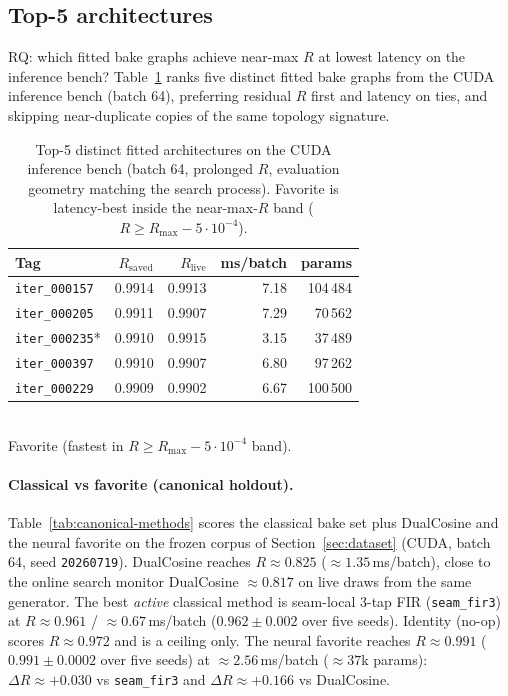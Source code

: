 \subsection{Top-5 architectures}
\label{sec:top5-arch}
RQ: which fitted bake graphs achieve near-max $R$ at lowest latency on the inference bench?
Table~\ref{tab:top5} ranks five distinct fitted bake graphs from the CUDA inference bench
(batch 64), preferring residual $R$ first and latency on ties,
and skipping near-duplicate copies of the same topology signature.

\begin{table}[t]
  \centering
  \caption{Top-5 distinct fitted architectures on the CUDA inference bench (batch 64, prolonged $R$, evaluation geometry matching the search process). Favorite is latency-best inside the near-max-$R$ band ($R\ge R_{\max}-5\cdot10^{-4}$).}
  \label{tab:top5}
  \setlength{\tabcolsep}{3pt}
  \begin{tabular}{@{}lrrrr@{}}
    \toprule
    Tag & $R_{\mathrm{saved}}$ & $R_{\mathrm{live}}$ & ms/batch & params \\
    \midrule
    \texttt{iter\_000157} & 0.9914 & 0.9913 & 7.18 & 104\,484 \\
    \texttt{iter\_000205} & 0.9911 & 0.9907 & 7.29 & 70\,562 \\
    \texttt{iter\_000235}* & 0.9910 & 0.9915 & 3.15 & 37\,489 \\
    \texttt{iter\_000397} & 0.9910 & 0.9907 & 6.80 & 97\,262 \\
    \texttt{iter\_000229} & 0.9909 & 0.9902 & 6.67 & 100\,500 \\
    \bottomrule
  \end{tabular}\\[0.4em]
  {\footnotesize *Favorite (fastest in $R\ge R_{\max}-5\cdot10^{-4}$ band).}
\end{table}

\paragraph{Classical vs favorite (canonical holdout).}
Table~\ref{tab:canonical-methods} scores the classical bake set plus DualCosine and the neural favorite on the frozen corpus of Section~\ref{sec:dataset} (CUDA, batch 64, seed \texttt{20260719}).
DualCosine reaches $R\approx 0.825$ ($\approx 1.35$\,ms/batch), close to the online search monitor DualCosine $\approx 0.817$ on live draws from the same generator.
The best \emph{active} classical method is seam-local 3-tap FIR (\texttt{seam\_fir3}) at $R\approx 0.961$ / $\approx 0.67$\,ms/batch ($0.962\pm0.002$ over five seeds).
Identity (no-op) scores $R\approx 0.972$ and is a ceiling only.
The neural favorite reaches $R\approx 0.991$ ($0.991\pm0.0002$ over five seeds) at $\approx 2.56$\,ms/batch ($\approx 37$k params): $\Delta R \approx {+}0.030$ vs \texttt{seam\_fir3} and $\Delta R \approx {+}0.166$ vs DualCosine.

